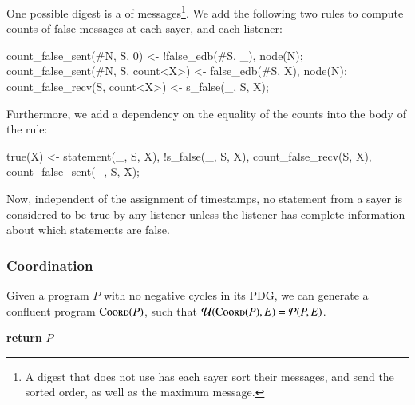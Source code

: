 
One possible digest is a  of  messages\footnote{A digest that does not use  has each sayer sort their messages, and send the sorted order, as well as the maximum message.}.  We add the following two rules to compute counts of false messages at each sayer, and each listener:

\begin{Dedalus}
count_false_sent(#N, S, 0) <- !false_edb(#S, _), node(N);
count_false_sent(#N, S, count<X>) <- false_edb(#S, X),
                                     node(N);
count_false_recv(S, count<X>) <- s_false(_, S, X);
\end{Dedalus}

Furthermore, we add a dependency on the equality of the counts into the body of the  rule:

\begin{Dedalus}
true(X) <- statement(_, S, X), !s_false(_, S, X),
           count_false_recv(S, X),
           count_false_sent(_, S, X);
\end{Dedalus}

Now, independent of the assignment of timestamps, no statement from a sayer  is considered to be true by any listener unless the listener has complete information about which statements are false.

\subsubsection{Coordination}
Given a \lang program $P$ with no negative cycles in its PDG, we can generate a confluent program $\textsc{Coord}(P)$, such that \linebreak $\mathcal{U}(\textsc{Coord}(P), E) = \mathcal{P}(P, E)$.


\begin{algorithmic}[0]
  \EndFor
  \EndFor
  \EndFor%
  \State \textbf{return} $P$
  \EndProcedure
\end{algorithmic}


